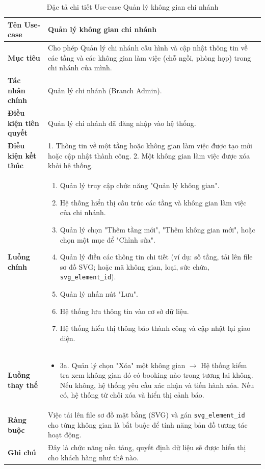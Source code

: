 \begin{table}[H]
\centering
\renewcommand{\arraystretch}{1.3}
\begin{tabular}{|p{4cm}|p{10cm}|}
\hline
\textbf{Tên Use-case} 
& Quản lý không gian chi nhánh \\ 
\hline

\textbf{Mục tiêu} 
& Cho phép Quản lý chi nhánh cấu hình và cập nhật thông tin về các tầng và các không gian làm việc (chỗ ngồi, phòng họp) trong chi nhánh của mình. \\ 
\hline

\textbf{Tác nhân chính} 
& Quản lý chi nhánh (Branch Admin). \\ 
\hline

\textbf{Điều kiện tiên quyết} 
& Quản lý chi nhánh đã đăng nhập vào hệ thống. \\ 
\hline

\textbf{Điều kiện kết thúc} 
& 
1. Thông tin về một tầng hoặc không gian làm việc được tạo mới hoặc cập nhật thành công.
2. Một không gian làm việc được xóa khỏi hệ thống.
\\ 
\hline

\textbf{Luồng chính} 
& 
\begin{enumerate}
    \item Quản lý truy cập chức năng "Quản lý không gian".
    \item Hệ thống hiển thị cấu trúc các tầng và không gian làm việc của chi nhánh.
    \item Quản lý chọn "Thêm tầng mới", "Thêm không gian mới", hoặc chọn một mục để "Chỉnh sửa".
    \item Quản lý điền các thông tin chi tiết (ví dụ: số tầng, tải lên file sơ đồ SVG; hoặc mã không gian, loại, sức chứa, \texttt{svg\_element\_id}).
    \item Quản lý nhấn nút "Lưu".
    \item Hệ thống lưu thông tin vào cơ sở dữ liệu.
    \item Hệ thống hiển thị thông báo thành công và cập nhật lại giao diện.
\end{enumerate} \\ 
\hline

\textbf{Luồng thay thế} 
& 
\begin{itemize}
    \item 3a. Quản lý chọn "Xóa" một không gian $\rightarrow$ Hệ thống kiểm tra xem không gian đó có booking nào trong tương lai không. Nếu không, hệ thống yêu cầu xác nhận và tiến hành xóa. Nếu có, hệ thống từ chối xóa và hiển thị cảnh báo.
\end{itemize} \\ 
\hline

\textbf{Ràng buộc} 
& Việc tải lên file sơ đồ mặt bằng (SVG) và gán \texttt{svg\_element\_id} cho từng không gian là bắt buộc để tính năng bản đồ tương tác hoạt động. \\ 
\hline

\textbf{Ghi chú} 
& Đây là chức năng nền tảng, quyết định dữ liệu sẽ được hiển thị cho khách hàng như thế nào. \\ 
\hline
\end{tabular}
\caption{Đặc tả chi tiết Use-case Quản lý không gian chi nhánh}
\label{tab:space-management-spec}
\end{table}
